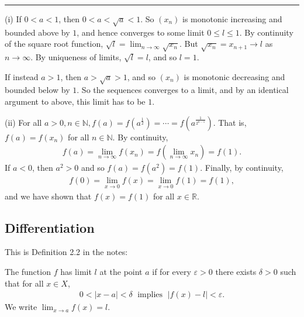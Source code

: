 \documentclass[letterpaper,10pt,english]{jupyterBook}
\begin{document}
\bigskip\hrule\bigskip


\sphinxAtStartPar
{\hyperref[\detokenize{Problems:id36}]{}}
(i) If \(0<a<1\), then \(0<a<\sqrt{a}<1\). So \((x_n)\) is monotonic increasing and bounded above by \(1\), and hence converges to some limit \(0\leq l\leq 1\). By continuity of the square root function, \(\sqrt{l}=\lim_{n\rightarrow\infty}\sqrt{x_n}\). But \(\sqrt{x_n}=x_{n+1}\rightarrow l\) as \(n\rightarrow\infty\). By uniqueness of limits, \(\sqrt{l}=l\), and so \(l=1\).

If instead \(a>1\), then \(a>\sqrt{a}>1\), and so \((x_n)\) is monotonic decreasing and bounded below by \(1\). So the sequences converges to a limit, and by an identical argument to above, this limit has to be \(1\).

\sphinxAtStartPar
(ii) For all \(a>0, n\in\mathbb{N}, f(a) = f\left(a^{\frac{1}{2}}\right) = \cdots = f\left(a^{\frac{1}{2^{n-1}}}\right)\). That is, \(f(a)=f(x_n)\) for all \(n\in\mathbb{N}\). By continuity,
\begin{equation*}
\begin{split}
f(a) = \lim_{n\rightarrow\infty} f(x_n) = f\left(\lim_{n\rightarrow\infty} x_n\right) = f(1).
\end{split}
\end{equation*}
\sphinxAtStartPar
If \(a<0\), then \(a^2>0\) and so \(f(a)=f\left(a^2\right)=f(1)\). Finally, by continuity,
\begin{equation*}
\begin{split}
f(0)=\lim_{x\rightarrow 0}f(x) = \lim_{x\rightarrow 0}f(1) = f(1),
\end{split}
\end{equation*}
\sphinxAtStartPar
and we have shown that \(f(x)=f(1)\) for all \(x\in\mathbb{R}\).


\subsection{Differentiation}
\label{\detokenize{Solutions-full:differentiation}}\label{\detokenize{Solutions-full:ch4sol}}
\sphinxAtStartPar
{\hyperref[\detokenize{Problems:id37}]{}} This is Definition 2.2 in the notes:

The function \(f\) has limit \(l\) at the point \(a\) if for every \(\varepsilon>0\) there exists \(\delta>0\) such that for all \(x\in X\),
\begin{equation*}
\begin{split}
0<|x-a|<\delta \; \text{ implies } \; |f(x)-l|<\varepsilon.
\end{split}
\end{equation*}
\sphinxAtStartPar
We write \(\lim_{x\to a}f(x)=l\).
\end{document}
